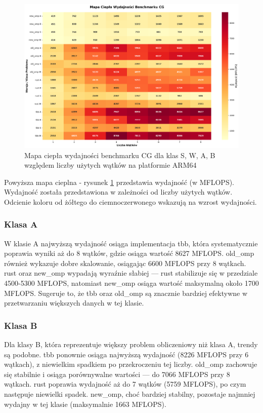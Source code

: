 \begin{figure}[H]
    \centering
    \includegraphics[width=\textwidth]{analiza/images/parallel/cg/arm/cg_mapa_ciepla_wydajnosci.png}
    \caption{Mapa ciepła wydajności benchmarku CG dla klas S, W, A, B względem liczby użytych wątków na platformie ARM64}
    \label{cg_heatmap_wydajnosci}
\end{figure}
Powyższa mapa cieplna - rysunek \ref{cg_heatmap_wydajnosci} przedstawia wydajność (w MFLOPS). Wydajność została przedstawiona w zależności od liczby użytych wątków. Odcienie koloru od żółtego do ciemnoczerwonego wskazują na wzrost wydajności.

\subsubsection{Klasa A}
W klasie A najwyższą wydajność osiąga implementacja tbb, która systematycznie poprawia wyniki aż do 8 wątków, gdzie osiąga wartość 8627 MFLOPS. old\_omp również wykazuje dobre skalowanie, osiągając 6600 MFLOPS przy 8 wątkach. rust oraz new\_omp wypadają wyraźnie słabiej — rust stabilizuje się w przedziale 4500-5300 MFLOPS, natomiast new\_omp osiąga wartość maksymalną około 1700 MFLOPS. Sugeruje to, że tbb oraz old\_omp są znacznie bardziej efektywne w przetwarzaniu większych danych w tej klasie.

\subsubsection{Klasa B}
Dla klasy B, która reprezentuje większy problem obliczeniowy niż klasa A, trendy są podobne. tbb ponownie osiąga najwyższą wydajność (8226 MFLOPS przy 6 wątkach), z niewielkim spadkiem po przekroczeniu tej liczby. old\_omp zachowuje się stabilnie i osiąga porównywalne wartości — do 7066 MFLOPS przy 8 wątkach. rust poprawia wydajność aż do 7 wątków (5759 MFLOPS), po czym następuje niewielki spadek. new\_omp, choć bardziej stabilny, pozostaje najmniej wydajny w tej klasie (maksymalnie 1663 MFLOPS).

